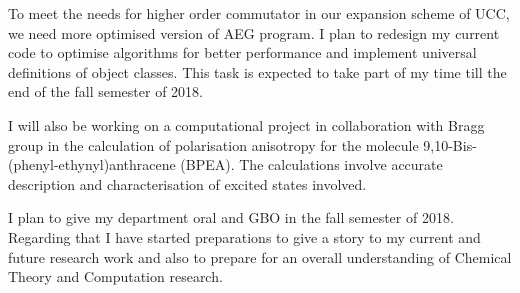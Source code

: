 \documentclass[11pt]{article}   	%
\begin{document}
To meet the needs for higher order commutator in our expansion scheme of UCC, we need more optimised version of AEG program. I plan to redesign my current code to optimise  algorithms for better performance and implement universal definitions of object classes. This task is expected to take part of my time till the end of the fall semester of 2018. 

I will also be working on a computational project in collaboration with Bragg group in the calculation of polarisation anisotropy for the molecule 9,10-Bis-(phenyl-ethynyl)anthracene (BPEA). The calculations involve accurate description and characterisation of excited states involved.

I plan to give my department oral and GBO in the fall semester of 2018. Regarding that I have started preparations to give a story to my current and future research work and also to prepare for an overall understanding of Chemical Theory and Computation research. 
\end{document}
